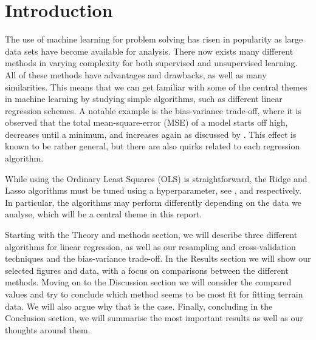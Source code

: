 \section{Introduction}
\label{sec:introduction}

The use of machine learning for problem solving has risen in popularity as large data sets have become available for analysis. There now exists many different methods in varying complexity for both supervised and unsupervised learning. All of these methods have advantages and drawbacks, as well as many similarities. This means that we can get familiar with some of the central themes in machine learning by studying simple algorithms, such as different linear regression schemes. A notable example is the bias-variance trade-off, where it is observed that the total mean-square-error (MSE) of a model starts off high, decreases until a minimum, and increases again as discussed by \citet{hastie2009elements}. This effect is known to be rather general, but there are also quirks related to each regression algorithm.

While using the Ordinary Least Squares (OLS) is straightforward, the Ridge and Lasso algorithms must be tuned using a hyperparameter, see \citet{hoerl1970ridge}, and \citet{tibshirani1996lasso} respectively. In particular, the algorithms may perform differently depending on the data we analyse, which will be a central theme in this report.

Starting with the Theory and methods section, we will describe three different algorithms for linear regression, as well as our resampling and cross-validation techniques and the bias-variance trade-off. In the Results section we will show our selected figures and data, with a focus on comparisons between the different methods. Moving on to the Discussion section we will consider the compared values and try to conclude which method seems to be most fit for fitting terrain data. We will also argue why that is the case. Finally, concluding in the Conclusion section, we will summarise the most important results as well as our thoughts around them.